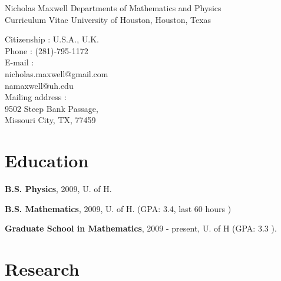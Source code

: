 \documentclass[letterpaper]{article}
\begin{document}
\vspace{0.25in}

\begin{flushleft}
Nicholas Maxwell \hfill Departments of Mathematics and Physics \\
Curriculum Vitae \hfill  University of Houston, Houston, Texas \\
\hrulefill
\end{flushleft}

\begin{flushleft}
Citizenship : U.S.A., U.K.\\
Phone : (281)-795-1172\\
E-mail : \\
\hspace{0.25in} nicholas.maxwell@gmail.com\\
\hspace{0.25in} namaxwell@uh.edu\\
Mailing address : \\
\hspace{0.25in} 9502 Steep Bank Passage,\\
\hspace{0.25in} Missouri City, TX, 77459
\end{flushleft}

\section*{Education}

\begin{flushleft}
\hspace{0.25in} {\bf B.S. Physics}, 2009, U. of H.\\
\end{flushleft}
\begin{flushleft}
\hspace{0.25in} {\bf B.S. Mathematics}, 2009, U. of H. (GPA: 3.4, last 60 hours )
\end{flushleft}
\begin{flushleft}
\hspace{0.25in} {\bf Graduate School in Mathematics}, 2009 - present, U. of H  (GPA: 3.3     ).
\end{flushleft}

\section*{Research}
\end{document}
